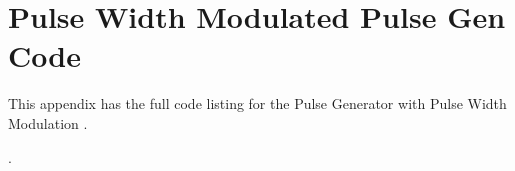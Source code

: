 \chapter{Pulse Width Modulated Pulse Gen Code} \label{App:PWMGenCode}
This appendix has the full code listing for the Pulse Generator with Pulse Width Modulation .

. 